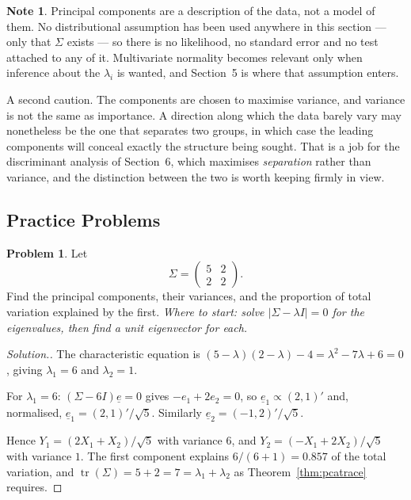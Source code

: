 \documentclass[11pt,a4paper]{article}
\theoremstyle{definition}
\newtheorem{note}[thm]{Note}
\newtheorem{problemx}{Problem}[section]
\newenvironment{problem}{\begin{problemx}}{\end{problemx}}
\newenvironment{solution}
  {\renewcommand{\qedsymbol}{}\begin{proof}[\textit{Solution}.]}
  {\end{proof}}
\begin{document}
\begin{note}
Principal components are a description of the data, not a model of them. No
distributional assumption has been used anywhere in this section --- only that
$\Sigma$ exists --- so there is no likelihood, no standard error and no test
attached to any of it. Multivariate normality becomes relevant only when
inference about the $\lambda_i$ is wanted, and Section~5 is where that
assumption enters.

A second caution. The components are chosen to maximise variance, and variance
is not the same as importance. A direction along which the data barely vary may
nonetheless be the one that separates two groups, in which case the leading
components will conceal exactly the structure being sought. That is a job for
the discriminant analysis of Section~6, which maximises \emph{separation}
rather than variance, and the distinction between the two is worth keeping
firmly in view.
\end{note}

\subsection{Practice Problems}

\begin{problem}
Let
$$\Sigma = \begin{pmatrix} 5 & 2\\ 2 & 2 \end{pmatrix}.$$
Find the principal components, their variances, and the proportion of total
variation explained by the first.
\emph{Where to start: solve $\left|\Sigma-\lambda I\right|=0$ for the
eigenvalues, then find a unit eigenvector for each.}
\end{problem}

\begin{solution}
The characteristic equation is
$(5-\lambda)(2-\lambda)-4 = \lambda^{2}-7\lambda+6 = 0$, giving
$\lambda_1 = 6$ and $\lambda_2 = 1$.

For $\lambda_1=6$: $(\Sigma-6I)\underline{e}=0$ gives $-e_1+2e_2=0$, so
$\underline{e}_1 \propto (2,1)'$ and, normalised,
$\underline{e}_1 = (2,1)'/\sqrt5$. Similarly
$\underline{e}_2 = (-1,2)'/\sqrt5$.

Hence $Y_1 = \left(2X_1+X_2\right)/\sqrt5$ with variance $6$, and
$Y_2 = \left(-X_1+2X_2\right)/\sqrt5$ with variance $1$. The first component
explains $6/(6+1) = 0.857$ of the total variation, and
$\operatorname{tr}(\Sigma) = 5+2 = 7 = \lambda_1+\lambda_2$ as
Theorem~\ref{thm:pcatrace} requires.
\end{solution}
\end{document}
